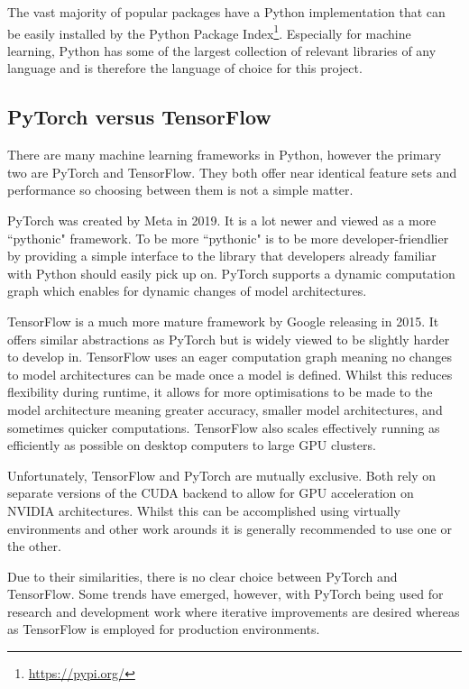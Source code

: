 The vast majority of popular packages have a Python implementation that can be easily installed by the Python Package Index\footnote{\url{https://pypi.org/}}. Especially for machine learning, Python has some of the largest collection of relevant libraries of any language and is therefore the language of choice for this project.

\subsection{PyTorch versus TensorFlow}

There are many machine learning frameworks in Python, however the primary two are PyTorch\cite{paszke2019pytorch} and TensorFlow\cite{abadi2016tensorflow}. They both offer near identical feature sets and performance so choosing between them is not a simple matter.

PyTorch was created by Meta in 2019. It is a lot newer and viewed as a more ``pythonic" framework\cite{chirodea2021comparison}. To be more ``pythonic" is to be more developer-friendlier by providing a simple interface to the library that developers already familiar with Python should easily pick up on. PyTorch supports a dynamic computation graph which enables for dynamic changes of model architectures.

TensorFlow is a much more mature framework by Google releasing in 2015. It offers similar abstractions as PyTorch but is widely viewed to be slightly harder to develop in\cite{chirodea2021comparison}. TensorFlow uses an eager computation graph meaning no changes to model architectures can be made once a model is defined. Whilst this reduces flexibility during runtime, it allows for more optimisations to be made to the model architecture meaning greater accuracy, smaller model architectures, and sometimes quicker computations. TensorFlow also scales effectively running as efficiently as possible on desktop computers to large GPU clusters.

Unfortunately, TensorFlow and PyTorch are mutually exclusive. Both rely on separate versions of the CUDA backend to allow for GPU acceleration on NVIDIA architectures. Whilst this can be accomplished using virtually environments and other work arounds it is generally recommended to use one or the other.

Due to their similarities, there is no clear choice between PyTorch and TensorFlow. Some trends have emerged, however, with PyTorch being used for research and development work where iterative improvements are desired whereas as TensorFlow is employed for production environments. 

